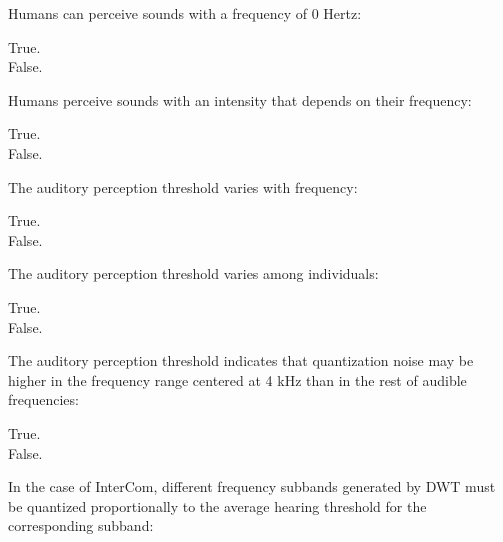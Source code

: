 \documentclass[legalpaper, 12pt, addpoints]{exam}
\begin{document}
\begin{questions}
\vspace{0.10in}

\question Humans can perceive sounds with a frequency of 0 Hertz:

\begin{oneparchoices}
  \choice True.\\
  \choice False.
\end{oneparchoices}
  
\vspace{0.10in}

\question Humans perceive sounds with an intensity that depends on their frequency:

\begin{oneparchoices}
  \choice True.\\
  \choice False.
\end{oneparchoices}
  
\vspace{0.10in}

\question The auditory perception threshold varies with frequency:

\begin{oneparchoices}
  \choice True.\\
  \choice False.
\end{oneparchoices}
  
\vspace{0.10in}

\question The auditory perception threshold varies among individuals:

\begin{oneparchoices}
  \choice True.\\
  \choice False.
\end{oneparchoices}
  
\vspace{0.10in}

\question The auditory perception threshold indicates that quantization noise may be higher in the frequency range centered at 4 kHz than in the rest of audible frequencies:

\begin{oneparchoices}
  \choice True.\\
  \choice False.
\end{oneparchoices}
  
\vspace{0.10in}

\question In the case of InterCom, different frequency subbands generated by DWT must be quantized proportionally to the average hearing threshold for the corresponding subband:


\end{questions}
\end{document}

